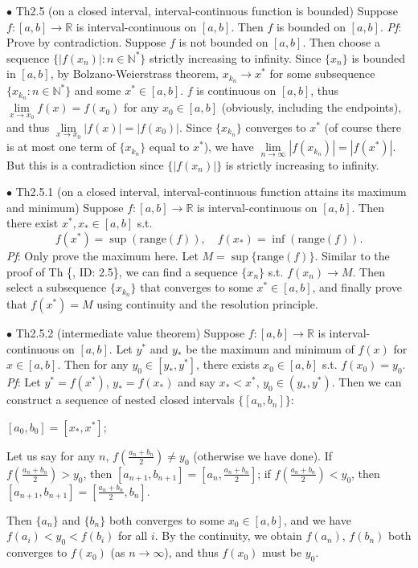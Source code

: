 \documentclass{article}
\begin{document}
\begin{Th}{$\bullet$ Th2.5 (on a closed interval, interval-continuous function is bounded)}
    Suppose $f:[a,b]\rightarrow\mathbb{R}$ is interval-continuous on $[a,b]$. Then $f$ is bounded on $[a,b]$.
    \tcblower
    \textit{Pf}: Prove by contradiction. Suppose $f$ is not bounded on $[a,b]$. Then choose a sequence $\{|f(x_n)|: n\in\mathbb{N}^*\}$ strictly increasing to infinity. Since $\{x_n\}$ is bounded in $[a,b]$, by Bolzano-Weierstrass theorem, $x_{k_n}\rightarrow x^*$ for some subsequence $\{x_{k_n}: n\in\mathbb{N}^*\}$ and some $x^*\in [a,b]$. $f$ is continuous on $[a,b]$, thus $\lim\limits_{x\to x_0}f(x) = f(x_0)$ for any $x_0\in[a,b]$ (obviously, including the endpoints), and thus $\lim\limits_{x\to x_0}|f(x)| = |f(x_0)|$. Since $\{x_{k_n}\}$ converges to $x^*$ (of course there is at most one term of $\{x_{k_n}\}$ equal to $x^*$), we have $\lim\limits_{n\to\infty}|f(x_{k_n})| = |f(x^*)|$. But this is a contradiction since $\{|f(x_n)|\}$ is strictly increasing to infinity.
\end{Th}

\begin{Th}{$\bullet$ Th2.5.1 (on a closed interval, interval-continuous function attains its maximum and minimum)}
    Suppose $f:[a,b]\rightarrow\mathbb{R}$ is interval-continuous on $[a,b]$. Then there exist $x^*, x_*\in [a,b]$ s.t. 
    $$f(x^*) = \sup(\text{range}(f)), \quad f(x_*) = \inf(\text{range}(f)).$$
    \tcblower
    \textit{Pf}: Only prove the maximum here. Let $M = \sup\{\text{range}(f)\}$. Similar to the proof of Th \{, ID: 2.5\}, we can find a sequence $\{x_n\}$ s.t. $f(x_n)\rightarrow M$. Then select a subsequence $\{x_{k_n}\}$ that converges to some $x^*\in[a,b]$, and finally prove that $f(x^*) = M$ using continuity and the resolution principle.
\end{Th}

\begin{Th}{$\bullet$ Th2.5.2 (intermediate value theorem)}
    Suppose $f:[a,b]\rightarrow\mathbb{R}$ is interval-continuous on $[a,b]$. Let $y^*$ and $y_*$ be the maximum and minimum of $f(x)$ for $x\in [a,b]$. Then for any $y_0\in [y_*, y^*]$, there exists $x_0\in [a,b]$ s.t. $f(x_0) = y_0$.
    \tcblower
    \textit{Pf}: Let $y^* = f(x^*)$, $y_* = f(x_*)$ and say $x_*<x^*$, $y_0\in(y_*, y^*)$. Then we can construct a sequence of nested closed intervals $\{[a_n, b_n]\}$:
    \begin{compactitem}
        \item $[a_0, b_0] = [x_*, x^*]$;
        \item Let us say for any $n$, $f(\frac{a_n+b_n}{2})\neq y_0 $ (otherwise we have done). If $f(\frac{a_n+b_n}{2})> y_0$, then $[a_{n+1}, b_{n+1}] = [a_n, \frac{a_n+b_n}{2}]$; if $f(\frac{a_n+b_n}{2})< y_0$, then $[a_{n+1}, b_{n+1}] = [\frac{a_n+b_n}{2}, b_n]$.
    \end{compactitem}
    Then $\{a_n\}$ and $\{b_n\}$ both converges to some $x_0\in [a,b]$, and we have $f(a_i)<y_0<f(b_i)$ for all $i$. By the continuity, we obtain $f(a_n)$, $f(b_n)$ both converges to $f(x_0)$ (as $n\rightarrow\infty$), and thus $f(x_0)$ must be $y_0$.
\end{Th}
\end{document}
